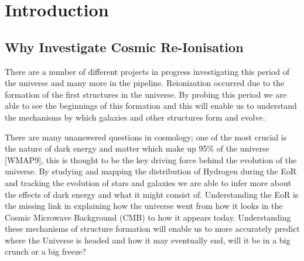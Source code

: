 
\section{Introduction} %
\label{sec:introduction}
    \subsection{Why Investigate Cosmic Re-Ionisation} %
    \label{sub:why_investigate_cosmic_re_ionisation}
    There are a number of different projects in progress investigating this period of the universe and many more in the pipeline. Reionization occurred due to the formation of the first structures in the universe. By probing this period we are able to see the beginnings of this formation and this will enable us to understand the mechanisms by which galaxies and other structures form and evolve.

    There are many unanswered questions in cosmology; one of the most crucial is the nature of dark energy and matter which make up 95\% of the universe [WMAP9], this is thought to be the key driving force behind the evolution of the universe. By studying and mapping the distribution of Hydrogen during the EoR and tracking the evolution of stars and galaxies we are able to infer more about the effects of dark energy and what it might consist of. Understanding the EoR is the missing link in explaining how the universe went from how it looks in the Cosmic Microwave Background (CMB) to how it appears today. Understanding these mechanisms of structure formation will enable us to more accurately predict where the Universe is headed and how it may eventually end, will it be in a big crunch or a big freeze?
